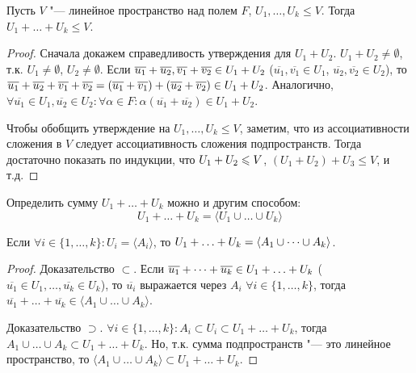\begin{proposition}
	Пусть $V$ "--- линейное пространство над полем $F$, $U_1, \dots, U_k \le V$. Тогда $U_1 + \dots + U_k \le V$.
\end{proposition}

\begin{proof}
	Сначала докажем справедливость утверждения для $U_1 + U_2$. $U_1 + U_2 \ne \emptyset$, т.\:к. $U_1 \ne \emptyset$, $U_2 \ne \emptyset$. Если $\overline{u_1} + \overline{u_2}, \overline{v_1} + \overline{v_2} \hm{\in} U_1 + U_2$ ($\overline{u_1}, \overline{v_1} \in U_1$, $\overline{u_2}, \overline{v_2} \in U_2$), то $\overline{u_1} + \overline{u_2} + \overline{v_1} + \overline{v_2} = (\overline{u_1} + \overline{v_1}) \hm{+} (\overline{u_2} + \overline{v_2}) \in U_1 + U_2$. Аналогично, $\forall \overline{u_1} \in U_1, \overline{u_2} \in U_2: \forall \alpha \in F: \alpha(\overline{u_1} + \overline{u_2}) \in U_1 + U_2$.
	
	Чтобы обобщить утверждение на $U_1, \dots, U_k \le V$, заметим, что из ассоциативности сложения в $V$ следует ассоциативность сложения подпространств. Тогда достаточно показать по индукции, что $U_1 \hm{+} U_2 \le V$, $(U_1 + U_2) + U_3 \le V$, и т.\:д.
\end{proof}

\begin{note}
	Определить сумму $U_1 + \dots + U_k$ можно и другим способом:
	\[U_1 + \dots + U_k = \langle U_1\cup\dots\cup U_k\rangle\]
\end{note}

\begin{proposition}
	Если $\forall i \in \{1, \dots, k\}: U_i = \langle A_i\rangle$, то $U_1 + \dots \hm{+} U_k \hm{=} \langle A_1 \cup \dots \cup A_k\rangle$.
\end{proposition}

\begin{proof}
	Доказательство $\subset$. Если $\overline{u_1} + \dots + \overline{u_k} \in U_1 + \dots \hm{+} U_k$ ($\overline{u_1} \in U_1, \dots, \overline{u_k} \in U_k$), то $\overline{u_i}$ выражается через $A_i$ $\forall i \in \{1, \dots, k\}$, тогда $\overline{u_1} + \dots + \overline{u_k} \in \langle A_1 \cup \dots \cup A_k\rangle$.
	
	Доказательство $\supset$. $\forall i \in \{1, \dots, k\}: A_i \subset U_i \subset U_1 + \dots + U_k$, тогда $A_1 \cup \dots \cup A_k \subset U_1 + \dots + U_k$. Но, т.\:к. сумма подпространств "--- это линейное пространство, то $\langle A_1 \cup \dots \cup A_k\rangle \subset U_1 + \dots + U_k$.
\end{proof}

